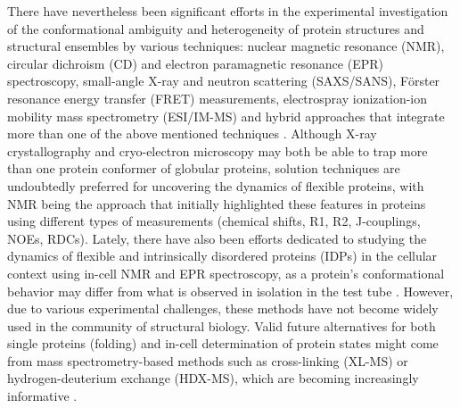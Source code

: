 There have nevertheless been significant efforts in the experimental investigation of the conformational ambiguity and heterogeneity of protein structures and structural ensembles by various techniques: nuclear magnetic resonance (NMR), circular dichroism (CD) and electron paramagnetic resonance (EPR) spectroscopy, small-angle X-ray and neutron scattering (SAXS/SANS), Förster resonance energy transfer (FRET) measurements, electrospray ionization-ion mobility mass spectrometry (ESI/IM-MS) and hybrid approaches that integrate more than one of the above mentioned techniques \cite{dobson_biophysical_2019}. Although X-ray crystallography and cryo-electron microscopy may both be able to trap more than one protein conformer of globular proteins, solution techniques are undoubtedly preferred for uncovering the dynamics of flexible proteins, with NMR being the approach that initially highlighted these features in proteins using different types of measurements (chemical shifts, R1, R2, J-couplings, NOEs, RDCs). Lately, there have also been efforts dedicated to studying the dynamics of flexible and intrinsically disordered proteins (IDPs) in the cellular context using in-cell NMR and EPR spectroscopy, as a protein’s conformational behavior may differ from what is observed in isolation in the test tube \cite{kragelund_-cell_2020, bonucci_crowding_2021}. However, due to various experimental challenges, these methods have not become widely used in the community of structural biology. Valid future alternatives for both single proteins (folding) and in-cell determination of protein states might come from mass spectrometry-based methods such as cross-linking (XL-MS) or hydrogen-deuterium exchange (HDX-MS), which are becoming increasingly informative \cite{britt_integration_2022}.

